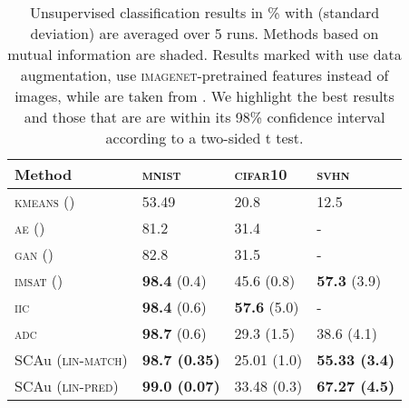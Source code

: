\documentclass{article}
\begin{document}
\begin{table}
	\centering
	\begin{minipage}[c]{.28\linewidth}
		\centering
		\caption{
			Unsupervised classification results in \% with (standard deviation) are averaged over 5 runs. Methods based on mutual information are shaded. Results marked with  use data augmentation,  use \textsc{imagenet}-pretrained features instead of images, while  are taken from \cite{Ji2018iic}. We highlight the best results and those that are are within its 98\% confidence interval according to a two-sided t test.
		}
		\label{tab:results}
	\end{minipage}
	\hfill
	\begin{minipage}[c]{.7\linewidth}
		\centering
		\small
		\begin{tabular}{@{}llll@{}}
			Method & \textsc{mnist} & \textsc{cifar10} & \textsc{svhn} \\
			\midrule
			\textsc{kmeans} (\cite{Haeusser2018adc}) & 53.49 & 20.8 & 12.5 \\
			\textsc{ae} (\cite{Bengio2007greedy}) & 81.2 & 31.4 & - \\
			\textsc{gan} (\cite{Radford2016gan}) & 82.8 & 31.5 & - \\
			\rowcolor[HTML]{EFEFEF} 
			\textsc{imsat} (\cite{Hu2017imsat}) & \textbf{98.4} (0.4) & 45.6 (0.8) & \textbf{57.3} (3.9) \\ 
			\rowcolor[HTML]{EFEFEF} 
			\textsc{iic} \citep{Ji2018iic} & \textbf{98.4} (0.6) & \textbf{57.6} (5.0) & - \\
			\rowcolor[HTML]{EFEFEF} 
			\textsc{adc} \citep{Haeusser2018adc} & \textbf{98.7} (0.6) & 29.3 (1.5) & 38.6 (4.1) \\
			\midrule
			\gls{SCAu} (\textsc{lin-match}) & \textbf{98.7 (0.35)} & 25.01 (1.0) & \textbf{55.33 (3.4)} \\ 
			\gls{SCAu} (\textsc{lin-pred}) & \textbf{99.0 (0.07)} & 33.48 (0.3) & \textbf{67.27 (4.5)} \\
		\end{tabular}
	\end{minipage}
\end{table}
\end{document}
